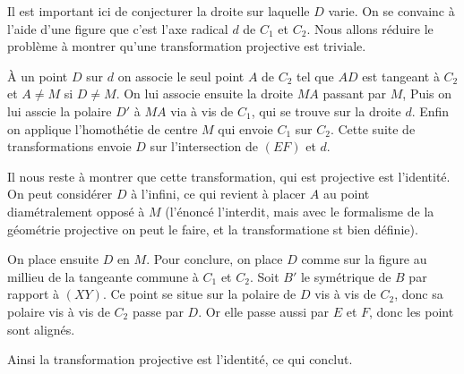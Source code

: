 \begin{sol}
Il est important ici de conjecturer la droite sur laquelle $D$ varie. On se convainc à l'aide d'une figure que c'est l'axe radical $d$ de $C_1$ et $C_2$. Nous allons réduire le problème à montrer qu'une transformation projective est triviale.

\medskip

À un point $D$ sur $d$ on associe le seul point $A$ de $C_2$ tel que $AD$ est tangeant à $C_2$ et $A\neq M$ si $D\neq M$. On lui associe ensuite la droite $MA$ passant par $M$, Puis on lui asscie la polaire $D'$ à $MA$ via à vis de $C_1$, qui se trouve sur la droite $d$. Enfin on applique l'homothétie de centre $M$ qui envoie $C_1$ sur $C_2$. Cette suite de transformations envoie $D$ sur l'intersection de $(EF)$ et $d$.

\medskip

Il nous reste à montrer que cette transformation, qui est projective est l'identité. On peut considérer $D$ à l'infini, ce qui revient à placer $A$ au point diamétralement opposé à $M$ (l'énoncé l'interdit, mais avec le formalisme de la géométrie projective on peut le faire, et la transformatione st bien définie).

On place ensuite $D$ en $M$. Pour conclure, on place $D$ comme sur la figure au millieu de la tangeante commune à $C_1$ et $C_2$. Soit $B'$ le symétrique de $B$ par rapport à $(XY)$. Ce point se situe sur la polaire de $D$ vis à vis de $C_2$, donc sa polaire vis à vis de $C_2$ passe par $D$. Or elle passe aussi par $E$ et $F$, donc les point sont alignés.


\medskip

Ainsi la transformation projective est l'identité, ce qui conclut.

\end{sol}

%
